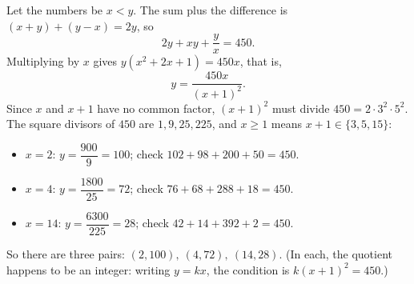 Let the numbers be $x<y$. The sum plus the difference is $(x+y)+(y-x)=2y$, so
\[
2y+xy+\dfrac{y}{x}=450 .
\]
Multiplying by $x$ gives $y(x^2+2x+1)=450x$, that is,
\[
y=\dfrac{450x}{(x+1)^2}.
\]
Since $x$ and $x+1$ have no common factor, $(x+1)^2$ must divide $450=2\cdot3^2\cdot5^2$. The square divisors of $450$ are $1,9,25,225$, and $x\ge1$ means $x+1\in\{3,5,15\}$:
\begin{itemize}
\item $x=2$: $y=\dfrac{900}{9}=100$; check $102+98+200+50=450$.
\item $x=4$: $y=\dfrac{1800}{25}=72$; check $76+68+288+18=450$.
\item $x=14$: $y=\dfrac{6300}{225}=28$; check $42+14+392+2=450$.
\end{itemize}
So there are three pairs: $\boxed{(2,100),\ (4,72),\ (14,28)}$. (In each, the quotient happens to be an integer: writing $y=kx$, the condition is $k(x+1)^2=450$.)
